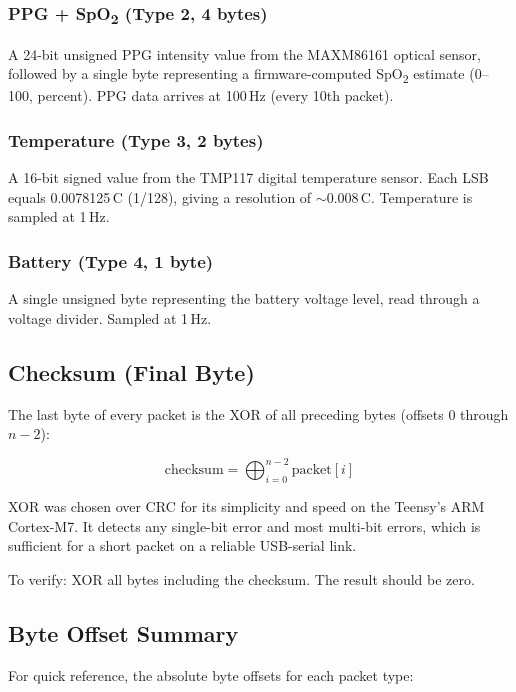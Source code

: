 \documentclass[11pt,a4paper]{article}
\begin{document}
\subsubsection{PPG + SpO\textsubscript{2} (Type 2, 4 bytes)}

A 24-bit unsigned PPG intensity value from the MAXM86161 optical sensor, followed by a single byte representing a firmware-computed SpO\textsubscript{2} estimate (0--100, percent).  PPG data arrives at 100\,Hz (every 10th packet).

\subsubsection{Temperature (Type 3, 2 bytes)}

A 16-bit signed value from the TMP117 digital temperature sensor.  Each LSB equals 0.0078125\,\textdegree C (1/128), giving a resolution of ${\sim}$0.008\,\textdegree C.  Temperature is sampled at 1\,Hz.

\subsubsection{Battery (Type 4, 1 byte)}

A single unsigned byte representing the battery voltage level, read through a voltage divider.  Sampled at 1\,Hz.

\subsection{Checksum (Final Byte)}

The last byte of every packet is the XOR of all preceding bytes (offsets 0 through $n{-}2$):

\[
\text{checksum} = \bigoplus_{i=0}^{n-2} \text{packet}[i]
\]

XOR was chosen over CRC for its simplicity and speed on the Teensy's ARM Cortex-M7.  It detects any single-bit error and most multi-bit errors, which is sufficient for a short packet on a reliable USB-serial link.

To verify: XOR all bytes including the checksum.  The result should be zero.

\subsection{Byte Offset Summary}

For quick reference, the absolute byte offsets for each packet type:
\end{document}
